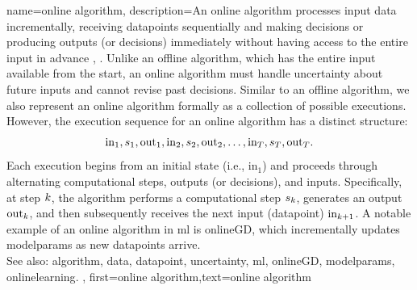 {name={online algorithm},
	description={An online \gls{algorithm} processes input \gls{data} incrementally, 
		receiving \glspl{datapoint} sequentially and making decisions or producing outputs (or decisions) immediately 
		without having access to the entire input in advance \cite{PredictionLearningGames}, \cite{HazanOCO}. 
		Unlike an offline \gls{algorithm}, which has the entire input available from the start, an online \gls{algorithm} 
		must handle \gls{uncertainty} about future inputs and cannot revise past decisions. Similar to an 
		offline \gls{algorithm}, we also represent an online \gls{algorithm} formally as a collection of possible 
		executions. However, the execution sequence for an online \gls{algorithm} has a distinct structure:
		$${\rm in}_{1},s_1,{\rm out}_{1},{\rm in}_{2},s_2,{\rm out}_{2},\ldots,{\rm in}_{T},s_T,{\rm out}_{T}.$$ 
		Each execution begins from an initial state (i.e., \(\text{in}_{1}\)) and proceeds through alternating 
		computational steps, outputs (or decisions), and inputs. Specifically, at step \(k\), 
		the \gls{algorithm} performs a computational step \(s_{k}\), generates an output \(\text{out}_{k}\), 
		and then subsequently receives the next input (\gls{datapoint}) \(\text{in}_{k+1}\). A 
		notable example of an online \gls{algorithm} in \gls{ml} is \gls{onlineGD}, which incrementally 
		updates \gls{modelparams} as new \glspl{datapoint} arrive. 
					\\ 
		See also: \gls{algorithm}, \gls{data}, \gls{datapoint}, \gls{uncertainty}, \gls{ml}, \gls{onlineGD}, \gls{modelparams}, \gls{onlinelearning}.
	},
	first={online algorithm},text={online algorithm} 
}




